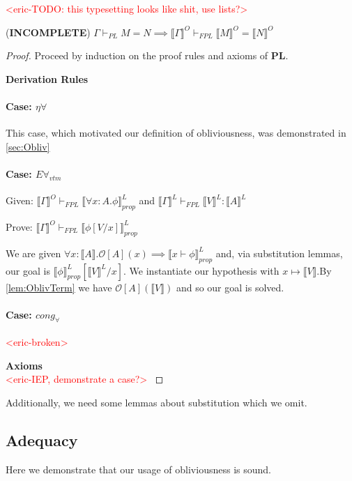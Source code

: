 \documentclass[acmsmall]{acmart}
\newcommand{\den}[1]{\llbracket #1\rrbracket}
\newcommand{\eric}[1]{\textcolor{red}{ <eric-#1> }}
\newcommand{\pl}{$\mathbf{PL}$}
\begin{document}
\eric{TODO: this typesetting looks like shit, use lists?}
\begin{theorem}
  \label{thm:OblivTranslation} (\textbf{INCOMPLETE})
$\Gamma \vdash_{PL} M = N \implies \den{\Gamma}^{O}\vdash_{FPL} \den{M}^{O} = \den{N}^{O} $
\end{theorem}
\begin{proof}
 Proceed by induction on the proof rules and axioms of \pl. 

 \textbf{Derivation Rules}
 \paragraph{Case: $\eta\forall$} This case, which motivated our definition of obliviousness, was demonstrated in \cref{sec:Obliv}
 
 \paragraph{Case: $E\forall_{vtm}$}
 \indent

 Given: $\den{\Gamma}^O \vdash_{FPL} \den{\forall x:A. \phi}^L_{prop}$ and $\den{\Gamma}^L \vdash_{FPL} \den{V}^L : \den{A}^L$

 Prove: $\den{\Gamma}^O \vdash_{FPL} \den{\phi[V/x]}^L_{prop}$

 We are given $\forall x : \den{A}.\mathcal{O}[A](x) \implies \den{x \vdash \phi}^L_{prop}$ and, via substitution lemmas, our goal is $\den{\phi}^L_{prop}[\den{V}^L/x]$. We instantiate our hypothesis with $x \mapsto \den{V}$.By \cref{lem:OblivTerm} we have $\mathcal{O}[A](\den{V})$ and so our goal is solved.

 \paragraph{Case: $cong_\forall$} \eric{broken}

 \textbf{Axioms}\\
\eric{IEP, demonstrate a case?}


\end{proof}
Additionally, we need some lemmas about substitution which we omit.






\subsection{Adequacy}
\label{sec:Adequacy}
Here we demonstrate that our usage of obliviousness is sound.
\end{document}
